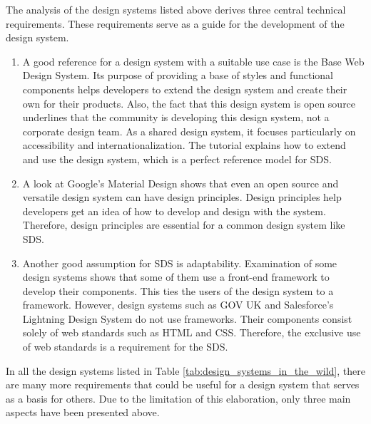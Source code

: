 The analysis of the design systems listed above derives three central technical requirements. These requirements serve as a guide for the development of the design system.
\begin{enumerate}
    \item A good reference for a design system with a suitable use case is the Base Web Design System. Its purpose of providing a base of styles and functional components helps developers to extend the design system and create their own for their products. Also, the fact that this design system is open source underlines that the community is developing this design system, not a corporate design team. As a shared design system, it focuses particularly on accessibility and internationalization. The tutorial explains how to extend and use the design system, which is a perfect reference model for \ac{SDS}. 
    \item A look at Google's Material Design shows that even an open source and versatile design system can have design principles. Design principles help developers get an idea of how to develop and design with the system. Therefore, design principles are essential for a common design system like SDS.
    \item Another good assumption for \ac{SDS} is adaptability. Examination of some design systems shows that some of them use a front-end framework to develop their components. This ties the users of the design system to a framework. However, design systems such as GOV UK and Salesforce's Lightning Design System do not use frameworks. Their components consist solely of web standards such as HTML and CSS. Therefore, the exclusive use of web standards is a requirement for the \ac{SDS}.
\end{enumerate}

In all the design systems listed in Table \ref{tab:design_systems_in_the_wild}, there are many more requirements that could be useful for a design system that serves as a basis for others. Due to the limitation of this elaboration, only three main aspects have been presented above.\\





